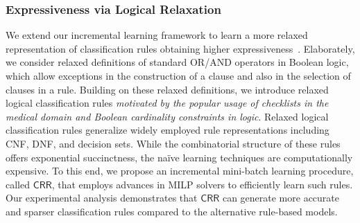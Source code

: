 \documentclass[11pt]{article}
\begin{document}
	\subsubsection*{Expressiveness via Logical Relaxation}
	We extend our incremental learning framework to learn a more relaxed representation of classification rules obtaining higher expressiveness~\cite{ghosh2020classification}. Elaborately, we consider relaxed definitions of standard OR/AND operators in Boolean logic, which allow exceptions in the construction of a clause and also in the selection of clauses in a rule. Building on these relaxed definitions, we introduce relaxed logical classification rules \textit{motivated by the popular usage of checklists in the medical domain and Boolean cardinality constraints in logic}. Relaxed logical classification rules generalize widely employed rule representations including CNF, DNF, and decision sets. While the combinatorial structure of these rules offers exponential succinctness, the na\"ive learning techniques are computationally expensive. To this end, we propose an incremental mini-batch learning procedure, called $ \mathsf{CRR} $, that employs advances in MILP solvers to efficiently learn such rules. Our experimental analysis demonstrates that $ \mathsf{CRR} $ can generate  more accurate and sparser classification rules compared to the alternative rule-based models.
	
	
	
	
	
\end{document}
